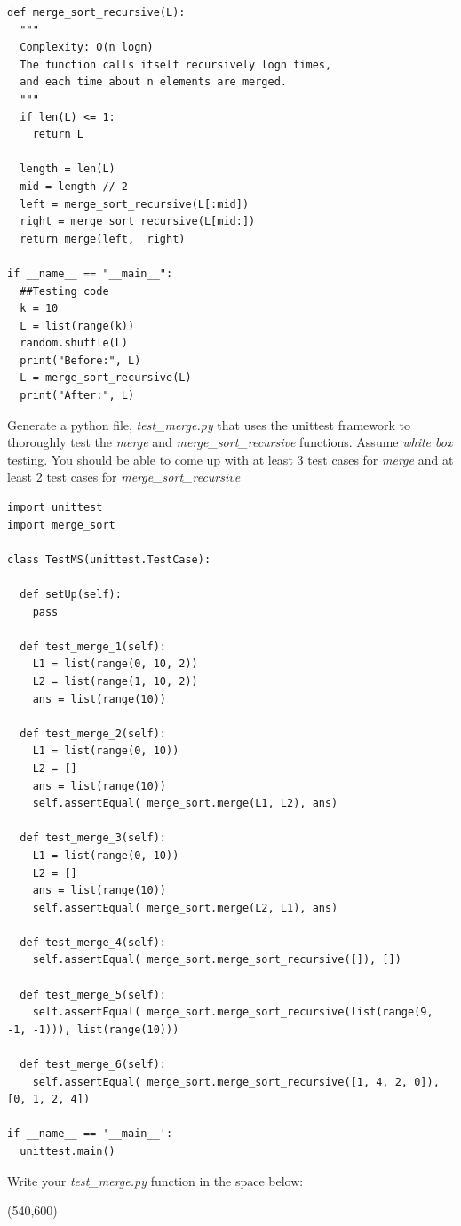 \documentclass[10pt]{article}
\begin{document}
\begin{enumerate}
\begin{verbatim}
def merge_sort_recursive(L):
  """ 
  Complexity: O(n logn)
  The function calls itself recursively logn times,
  and each time about n elements are merged.
  """
  if len(L) <= 1:
    return L

  length = len(L)
  mid = length // 2
  left = merge_sort_recursive(L[:mid])
  right = merge_sort_recursive(L[mid:])
  return merge(left,  right)

if __name__ == "__main__":
  ##Testing code
  k = 10
  L = list(range(k))
  random.shuffle(L)
  print("Before:", L)
  L = merge_sort_recursive(L)
  print("After:", L)
\end{verbatim}

\newpage

Generate a python file, \textit{test\_merge.py} that uses the unittest framework to thoroughly test the \textit{merge} and \textit{merge\_sort\_recursive} functions. 
Assume \textit{white box} testing. 
You should be able to come up with at least 3 test cases for \textit{merge} and at least 2 test cases for \textit{merge\_sort\_recursive}
    \beginanswers
\begin{verbatim}
import unittest
import merge_sort

class TestMS(unittest.TestCase):

  def setUp(self):
    pass

  def test_merge_1(self):
    L1 = list(range(0, 10, 2))
    L2 = list(range(1, 10, 2))
    ans = list(range(10))

  def test_merge_2(self):
    L1 = list(range(0, 10))
    L2 = []
    ans = list(range(10))
    self.assertEqual( merge_sort.merge(L1, L2), ans)

  def test_merge_3(self):
    L1 = list(range(0, 10))
    L2 = []
    ans = list(range(10))
    self.assertEqual( merge_sort.merge(L2, L1), ans)

  def test_merge_4(self):
    self.assertEqual( merge_sort.merge_sort_recursive([]), [])

  def test_merge_5(self):
    self.assertEqual( merge_sort.merge_sort_recursive(list(range(9, -1, -1))), list(range(10)))

  def test_merge_6(self):
    self.assertEqual( merge_sort.merge_sort_recursive([1, 4, 2, 0]), [0, 1, 2, 4])

if __name__ == '__main__':
  unittest.main()
\end{verbatim}
    \else
    Write your \textit{test\_merge.py} function in the space below:

    \hspace*{-0.4in}\framebox(540,600){}
    \fi


\end{enumerate}
\end{document}
